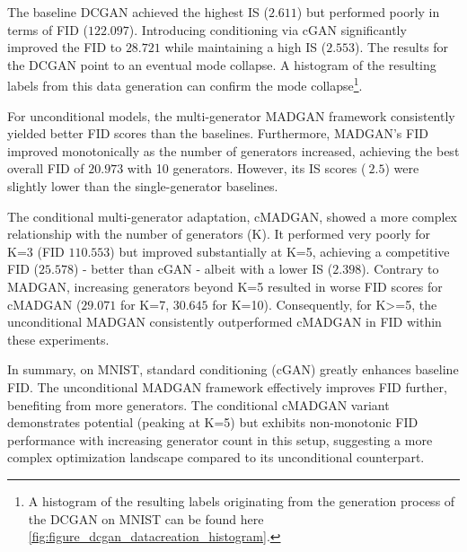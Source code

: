 The baseline DCGAN achieved the highest IS ($2.611$) but performed poorly in terms of FID ($122.097$). Introducing conditioning via cGAN significantly improved the FID to $28.721$ while maintaining a high IS ($2.553$). The results for the DCGAN point to an eventual mode collapse. A histogram of the resulting labels from this data generation can confirm the mode collapse\footnote{A histogram of the resulting labels originating from the generation process of the DCGAN on MNIST can be found here \ref{fig:figure_dcgan_datacreation_histogram}.}.

For unconditional models, the multi-generator MADGAN framework consistently yielded better FID scores than the baselines. Furthermore, MADGAN's FID improved monotonically as the number of generators increased, achieving the best overall FID of $20.973$ with 10 generators. However, its IS scores ($~2.5$) were slightly lower than the single-generator baselines.

The conditional multi-generator adaptation, cMADGAN, showed a more complex relationship with the number of generators (K). It performed very poorly for K=3 (FID $110.553$) but improved substantially at K=5, achieving a competitive FID ($25.578$) - better than cGAN - albeit with a lower IS ($2.398$). Contrary to MADGAN, increasing generators beyond K=5 resulted in worse FID scores for cMADGAN ($29.071$ for K=7, $30.645$ for K=10). Consequently, for K>=5, the unconditional MADGAN consistently outperformed cMADGAN in FID within these experiments.

In summary, on MNIST, standard conditioning (cGAN) greatly enhances baseline FID. The unconditional MADGAN framework effectively improves FID further, benefiting from more generators. The conditional cMADGAN variant demonstrates potential (peaking at K=5) but exhibits non-monotonic FID performance with increasing generator count in this setup, suggesting a more complex optimization landscape compared to its unconditional counterpart. \\

